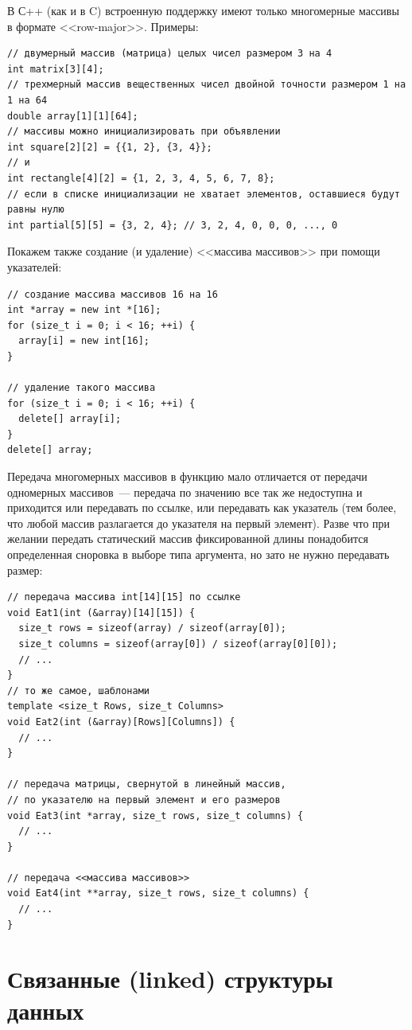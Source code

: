 В С++ (как и в C) встроенную поддержку имеют только многомерные массивы в формате <<row-major>>. Примеры:

\begin{verbatim}
// двумерный массив (матрица) целых чисел размером 3 на 4
int matrix[3][4];
// трехмерный массив вещественных чисел двойной точности размером 1 на 1 на 64
double array[1][1][64];
// массивы можно инициализировать при объявлении
int square[2][2] = {{1, 2}, {3, 4}};
// и
int rectangle[4][2] = {1, 2, 3, 4, 5, 6, 7, 8};
// если в списке инициализации не хватает элементов, оставшиеся будут равны нулю
int partial[5][5] = {3, 2, 4}; // 3, 2, 4, 0, 0, 0, ..., 0
\end{verbatim}

Покажем также создание (и удаление) <<массива массивов>> при помощи указателей:
\begin{verbatim}
// создание массива массивов 16 на 16
int *array = new int *[16];
for (size_t i = 0; i < 16; ++i) {
  array[i] = new int[16];
}

// удаление такого массива
for (size_t i = 0; i < 16; ++i) {
  delete[] array[i];
}
delete[] array;
\end{verbatim}

Передача многомерных массивов в функцию мало отличается от передачи одномерных массивов~--- передача по значению все так же недоступна
и приходится или передавать по ссылке, или передавать как указатель (тем более, что любой массив разлагается до указателя на
первый элемент). Разве что при желании передать статический массив 
фиксированной длины понадобится определенная сноровка в выборе типа аргумента, но зато не нужно передавать размер:

\begin{verbatim}
// передача массива int[14][15] по ссылке
void Eat1(int (&array)[14][15]) {
  size_t rows = sizeof(array) / sizeof(array[0]);
  size_t columns = sizeof(array[0]) / sizeof(array[0][0]);
  // ...
}
// то же самое, шаблонами
template <size_t Rows, size_t Columns>
void Eat2(int (&array)[Rows][Columns]) {
  // ...
}

// передача матрицы, свернутой в линейный массив,
// по указателю на первый элемент и его размеров
void Eat3(int *array, size_t rows, size_t columns) {
  // ...
}

// передача <<массива массивов>>
void Eat4(int **array, size_t rows, size_t columns) {
  // ...
}

\end{verbatim}
\section{Связанные (linked) структуры данных}
